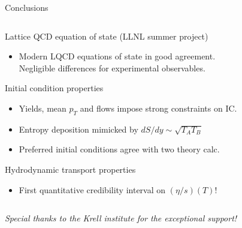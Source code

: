 \documentclass[xcolor=dvipsnames, aspectratio=169]{beamer}
\begin{document}
\begin{frame}[plain]{Conclusions}
\medskip
\begin{columns}
\begin{column}{0.85\textwidth}
Lattice QCD equation of state (LLNL summer project)
\begin{itemize}
    \item Modern LQCD equations of state in good agreement.\\ Negligible differences for experimental observables. 
\end{itemize}
\smallskip
Initial condition properties
\begin{itemize}
    \item Yields, mean $p_T$ and flows impose strong constraints on IC. \\
    \item Entropy  deposition mimicked by $dS/dy \sim \sqrt{T_A T_B}$ \\
    \item Preferred initial conditions agree with two theory calc. \\
\end{itemize}
\smallskip
Hydrodynamic transport properties
\begin{itemize}
    \item First quantitative credibility interval on $(\eta/s)(T)$!
\end{itemize}
\end{column}
\end{columns}
\end{frame}

\begin{frame}[plain]
    \centering
    \emph{Special thanks to the Krell institute for the exceptional support!}
\end{frame}

\appendix
\end{document}
